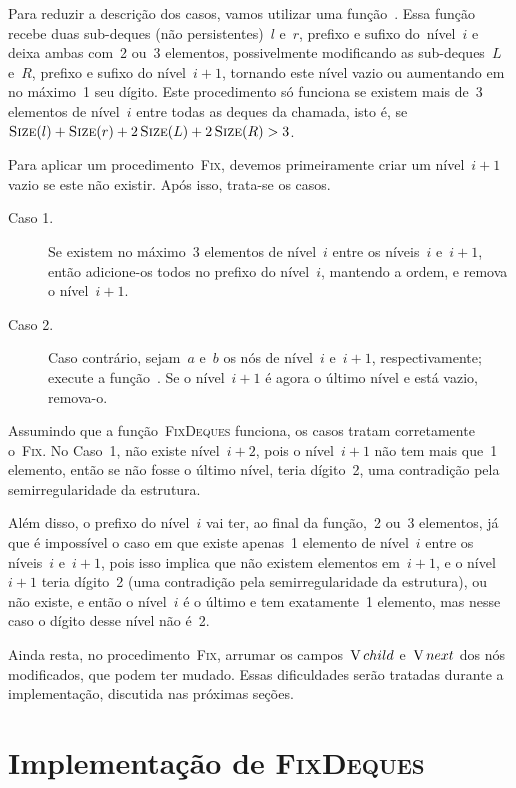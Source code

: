 \documentclass[main.tex]{subfiles}
\begin{document}
Para reduzir a descrição dos casos, vamos utilizar uma função~. Essa função recebe duas sub-deques (não persistentes)~$l$ e~$r$, prefixo e sufixo do~nível~$i$ e deixa ambas com~2 ou~3 elementos, possivelmente modificando as sub-deques~$L$ e~$R$, prefixo e sufixo do nível~$i+1$, tornando este nível vazio ou aumentando em no máximo~1 seu dígito. Este procedimento só funciona se existem mais de~3 elementos de nível~$i$ entre todas as deques da chamada, isto é, se~${\Call{Size}{l} + \Call{Size}{r} + 2\,\Call{Size}{L} + 2\,\Call{Size}{R} > 3}$.

Para aplicar um procedimento~\textsc{Fix}, devemos primeiramente criar um nível~$i+1$ vazio se este não existir. Após isso, trata-se os casos.

\begin{description}
    \item[Caso 1.] Se existem no máximo~3 elementos de nível~$i$ entre os níveis~$i$ e~$i+1$, então adicione-os todos no prefixo do nível~$i$, mantendo a ordem, e remova o nível~$i+1$.
    \item[Caso 2.] Caso contrário, sejam~$a$ e~$b$ os nós de nível~$i$ e~$i+1$, respectivamente; execute a função~. Se o nível~$i+1$ é agora o último nível e está vazio, remova-o.
\end{description}

Assumindo que a função~\textsc{FixDeques} funciona, os casos tratam corretamente o~\textsc{Fix}. No Caso~1, não existe nível~$i+2$, pois o nível~$i+1$ não tem mais que~1 elemento, então se não fosse o último nível, teria dígito~2, uma contradição pela semirregularidade da estrutura.

Além disso, o prefixo do nível~$i$ vai ter, ao final da função,~2 ou~3 elementos, já que é impossível o caso em que existe apenas~1 elemento de nível~$i$ entre os níveis~$i$ e~$i+1$, pois isso implica que não existem elementos em~$i+1$, e o nível~$i+1$ teria dígito~2 (uma contradição pela semirregularidade da estrutura), ou não existe, e então o nível~$i$ é o último e tem exatamente~1 elemento, mas nesse caso o dígito desse nível não é~2.

Ainda resta, no procedimento~\textsc{Fix}, arrumar os campos~$\operatorname{V}{child}$ e~$\operatorname{V}{next}$ dos nós modificados, que podem ter mudado. Essas dificuldades serão tratadas durante a implementação, discutida nas próximas seções.

\section{Implementação de {\normalfont \textsc{FixDeques}}} \label{sec:fix_deques}
\end{document}
